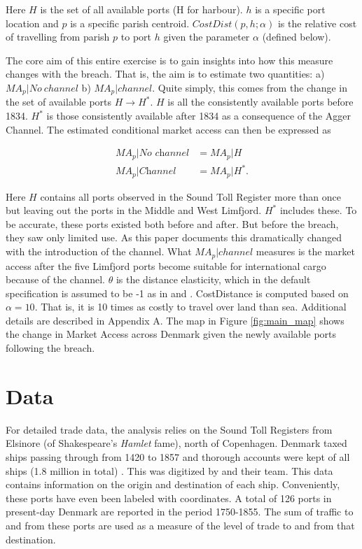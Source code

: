 \documentclass[11pt]{article}
\begin{document}
Here $H$ is the set of all available ports (H for harbour). $h$ is a specific port location and $p$ is a specific parish centroid. $CostDist(p, h; \alpha)$ is the relative cost of travelling from parish $p$ to port $h$ given the parameter $\alpha$ (defined below). 

The core aim of this entire exercise is to gain insights into how this measure changes with the breach. That is, the aim is to estimate two quantities: a) ${MA}_p|No\:channel$ b) ${MA}_p|channel$. Quite simply, this comes from the change in the set of available ports $H\rightarrow H^*$. $H$ is all the consistently available ports before 1834. $H^*$ is those consistently available after 1834 as a consequence of the Agger Channel. The estimated conditional market access can then be expressed as

\begin{equation}
\label{eq:MA3}
\begin{split}
{MA}_{p}|\textit{No channel} &= {MA}_{p}|H \\
{MA}_{p}|\textit{Channel} &= {MA}_{p}|H^*.
\end{split}
\end{equation}

Here $H$ contains all ports observed in the Sound Toll Register more than once but leaving out the ports in the Middle and West Limfjord. $H^*$ includes these. To be accurate, these ports existed both before and after. But before the breach, they saw only limited use. As this paper documents this dramatically changed with the introduction of the channel. What ${MA}_{p}|channel$ measures is the market access after the five Limfjord ports become suitable for international cargo because of the channel. $\theta$ is the distance elasticity, which in the default specification is assumed to be -1 as in \cite{Harris1954} and \cite{rauch2022a}. CostDistance is computed based on $\alpha = 10$. That is, it is 10 times as costly to travel over land than sea. Additional details are described in Appendix A. The map in Figure \ref{fig:main_map} shows the change in Market Access across Denmark given the newly available ports following the breach.

\FloatBarrier
\section{Data}
For detailed trade data, the analysis relies on the Sound Toll Registers from Elsinore (of Shakespeare's \textit{Hamlet} fame), north of Copenhagen. Denmark taxed ships passing through from 1420 to 1857 and thorough accounts were kept of all ships (1.8 million in total) \citep{gobel2010oresundstolden}. This was digitized by \cite{soundtoll_data} and their team. This data contains information on the origin and destination of each ship. Conveniently, these ports have even been labeled with coordinates. A total of 126 ports in present-day Denmark are reported in the period 1750-1855. The sum of traffic to and from these ports are used as a measure of the level of trade to and from that destination. 
\end{document}

